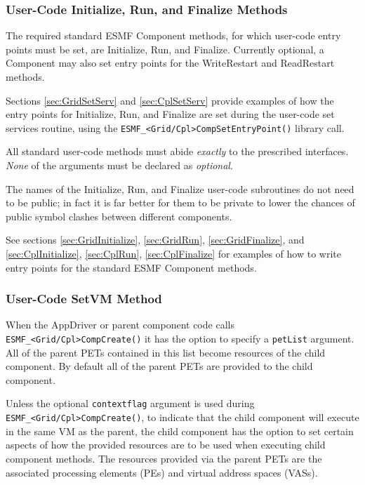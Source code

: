 \subsubsection{User-Code Initialize, Run, and Finalize Methods}

The required standard ESMF Component methods, for which user-code entry
points must be set, are Initialize, Run, and Finalize. Currently optional,
a Component may also set entry points for the WriteRestart and
ReadRestart methods.

Sections \ref{sec:GridSetServ} and \ref{sec:CplSetServ} provide examples
of how the entry points for Initialize, Run, and Finalize are set during
the user-code set services routine, using the 
{\tt ESMF\_<Grid/Cpl>CompSetEntryPoint()} library call.

All standard user-code methods must abide {\em exactly} to the prescribed
interfaces. {\em None} of the arguments must be declared as {\em optional}.

The names of the Initialize, Run, and Finalize user-code subroutines do
not need to be public; in fact it is far better for them to be private to
lower the chances of public symbol clashes between different components.

See sections \ref{sec:GridInitialize}, \ref{sec:GridRun},
\ref{sec:GridFinalize}, and \ref{sec:CplInitialize}, \ref{sec:CplRun},
\ref{sec:CplFinalize} for examples of how to write entry points for the 
standard ESMF Component methods.


\subsubsection{User-Code SetVM Method}
\label{sec:AppDriverSetVM}

When the AppDriver or parent component code calls
{\tt ESMF\_<Grid/Cpl>CompCreate()} it has the option to specify a 
{\tt petList} argument. All of the parent PETs contained in this list become
resources of the child component. By default all of the parent PETs are 
provided to the child component.

Unless the optional {\tt contextflag} argument is used during 
{\tt ESMF\_<Grid/Cpl>CompCreate()}, to indicate that the child component will
execute in the same VM as the parent, the child component has the option
to set certain aspects of how the provided resources are to be used when
executing child component methods. The resources provided via the parent PETs
are the associated processing elements (PEs) and virtual address spaces (VASs).

